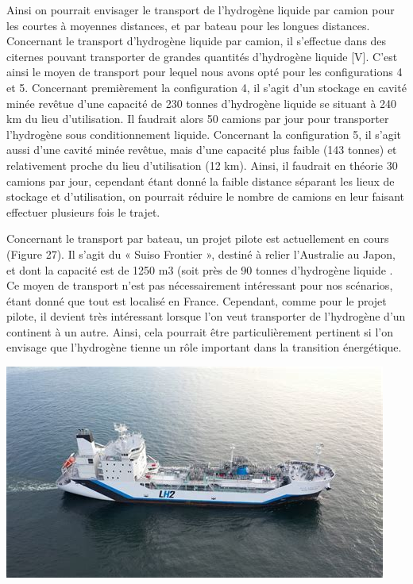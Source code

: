 \documentclass[11pt,french,a4paper]{article}
\begin{document}
Ainsi on pourrait envisager le transport de l’hydrogène liquide par camion pour les courtes à moyennes distances, et par bateau pour les longues distances. Concernant le transport d’hydrogène liquide par camion, il s’effectue dans des citernes pouvant transporter de grandes quantités d’hydrogène liquide [V]. C’est ainsi le moyen de transport pour lequel nous avons opté pour les configurations 4 et 5. Concernant premièrement la configuration 4, il s’agit d’un stockage en cavité minée revêtue d’une capacité de 230 tonnes d’hydrogène liquide se situant à 240 km du lieu d’utilisation. Il faudrait alors 50 camions par jour pour transporter l’hydrogène sous conditionnement liquide. Concernant la configuration 5, il s’agit aussi d’une cavité minée revêtue, mais d’une capacité plus faible (143 tonnes) et relativement proche du lieu d’utilisation (12 km). Ainsi, il faudrait en théorie 30 camions par jour, cependant étant donné la faible distance séparant les lieux de stockage et d’utilisation, on pourrait réduire le nombre de camions en leur faisant effectuer plusieurs fois le trajet.\\

\begin{multicols}{2}

Concernant le transport par bateau, un projet pilote est actuellement en cours (Figure 27). Il s’agit du « Suiso Frontier », destiné à relier l’Australie au Japon, et dont la capacité est de 1250 m3 (soit près de 90 tonnes d’hydrogène liquide \cite{The_Suiso_Frontier}. Ce moyen de transport n’est pas nécessairement intéressant pour nos scénarios, étant donné que tout est localisé en France. Cependant, comme pour le projet pilote, il devient très intéressant lorsque l’on veut transporter de l’hydrogène d’un continent à un autre. Ainsi, cela pourrait être particulièrement pertinent si l’on envisage que l’hydrogène tienne un rôle important dans la transition énergétique.

\begin{center}
\includegraphics[width=.9\linewidth]{image/chap3/Figure 3.ii-3.jpg}
\end{center}

\end{multicols}
\end{document}
